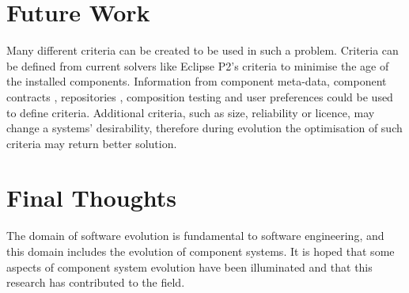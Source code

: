 \section{Future Work}






Many different criteria can be created to be used in such a problem.
Criteria can be defined from current solvers like Eclipse P2's criteria to minimise the age of the installed components.
Information from component meta-data, component contracts \citep{Watkins1999}, repositories \citep{Guo2000}, 
composition testing \citep{XuejieZhang2008} and user preferences could be used to define criteria.
Additional criteria, such as size, reliability or licence, may change a systems' desirability, 
therefore during evolution the optimisation of such criteria may return better solution.




\section{Final Thoughts}
The domain of software evolution is fundamental to software engineering, and this domain includes the evolution of component systems.
It is hoped that some aspects of component system evolution have been illuminated and that this research has contributed to the field. 

 
